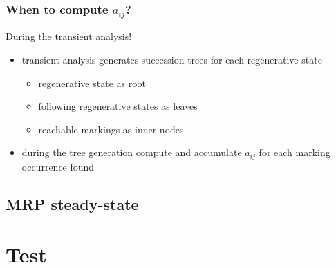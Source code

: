 \begin{frame}
  \frametitle{When to compute $a_{ij}$?}
  During the transient analysis!
  \begin{itemize}
  \item transient analysis generates succession trees for each
    regenerative state
    \begin{itemize}
    \item regenerative state as root
    \item following regenerative states as leaves
    \item reachable markings as inner nodes
    \end{itemize}
  \item during the tree generation compute and accumulate $a_{ij}$ for
    each marking occurrence found
  \end{itemize}
\end{frame}
\subsection{\acf{MRP} steady-state}
\begin{frame}
  \frametitle{\insertsubsection}
  
\end{frame}
\section{Test}
\begin{frame}
  \frametitle{\insertsection}
  
\end{frame}
